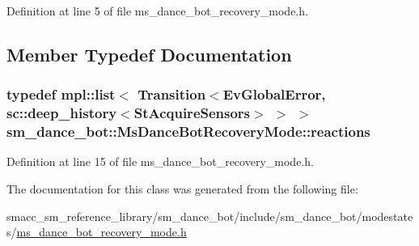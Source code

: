 Definition at line 5 of file ms\+\_\+dance\+\_\+bot\+\_\+recovery\+\_\+mode.\+h.



\subsection{Member Typedef Documentation}
\subsubsection[{\texorpdfstring{reactions}{reactions}}]{\setlength{\rightskip}{0pt plus 5cm}typedef mpl\+::list$<$ Transition$<${\bf Ev\+Global\+Error}, sc\+::deep\+\_\+history$<${\bf St\+Acquire\+Sensors}$>$ $>$ $>$ {\bf sm\+\_\+dance\+\_\+bot\+::\+Ms\+Dance\+Bot\+Recovery\+Mode\+::reactions}}\hypertarget{classsm__dance__bot_1_1MsDanceBotRecoveryMode_a666369214001b2d5628e4765f8a4ce6a}{}\label{classsm__dance__bot_1_1MsDanceBotRecoveryMode_a666369214001b2d5628e4765f8a4ce6a}


Definition at line 15 of file ms\+\_\+dance\+\_\+bot\+\_\+recovery\+\_\+mode.\+h.



The documentation for this class was generated from the following file\+:\begin{DoxyCompactItemize}
\item 
smacc\+\_\+sm\+\_\+reference\+\_\+library/sm\+\_\+dance\+\_\+bot/include/sm\+\_\+dance\+\_\+bot/modestates/\hyperlink{include_2sm__dance__bot_2modestates_2ms__dance__bot__recovery__mode_8h}{ms\+\_\+dance\+\_\+bot\+\_\+recovery\+\_\+mode.\+h}\end{DoxyCompactItemize}
